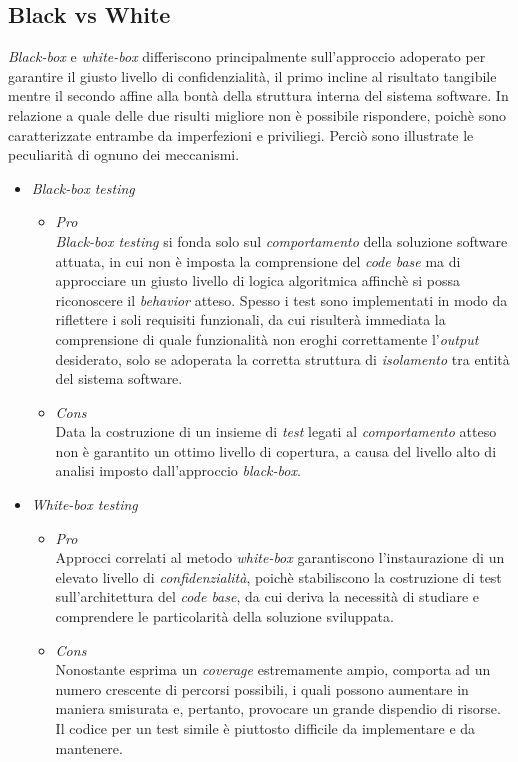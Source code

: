 \documentclass{article}
\begin{document}
\subsection*{Black vs White}
\large
\textit{Black-box} e \textit{white-box} differiscono principalmente sull'approccio adoperato per garantire il giusto livello di confidenzialità, il primo incline al risultato tangibile mentre il secondo affine alla bontà della struttura interna del sistema software. In relazione a quale delle due risulti migliore non è possibile rispondere, poichè sono caratterizzate entrambe da imperfezioni e priviliegi. Perciò sono illustrate le peculiarità di ognuno dei meccanismi.
\begin{itemize}[label={ }]
    \item \textit{Black-box testing}
    \begin{itemize}
        \item \textit{Pro}\\\textit{Black-box testing} si fonda solo sul \textit{comportamento} della soluzione software attuata, in cui non è imposta la comprensione del \textit{code base} ma di approcciare un giusto livello di logica algoritmica affinchè si possa riconoscere il \textit{behavior} atteso. Spesso i test sono implementati in modo da riflettere i soli requisiti funzionali, da cui risulterà immediata la comprensione di quale funzionalità non eroghi correttamente l'\textit{output} desiderato, solo se adoperata la corretta struttura di \textit{isolamento} tra entità del sistema software.
        \item \textit{Cons}\\Data la costruzione di un insieme di \textit{test} legati al \textit{comportamento} atteso non è garantito un ottimo livello di copertura, a causa del livello alto di analisi imposto dall'approccio \textit{black-box}.
    \end{itemize}
    \item \textit{White-box testing}
    \begin{itemize}[label={-}]
        \item \textit{Pro}\\Approcci correlati al metodo \textit{white-box} garantiscono l'instaurazione di un elevato livello di \textit{confidenzialità}, poichè stabiliscono la costruzione di test sull'architettura del \textit{code base}, da cui deriva la necessità di studiare e comprendere le particolarità della soluzione sviluppata.
        \item \textit{Cons}\\Nonostante esprima un \textit{coverage} estremamente ampio, comporta ad un numero crescente di percorsi possibili, i quali possono aumentare in maniera smisurata e, pertanto, provocare un grande dispendio di risorse. Il codice per un test simile è piuttosto difficile da implementare e da mantenere.
    \end{itemize}
\end{itemize}
\end{document}
